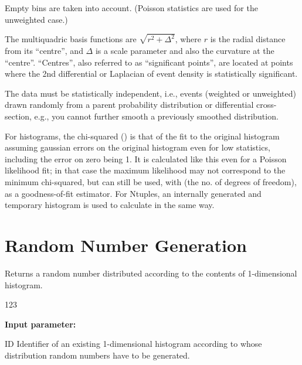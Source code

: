 \Remarks        
\begin{UL}
\item Empty bins are taken into account.  (Poisson statistics are used for the
      unweighted case.)
\item The multiquadric basis functions are $\sqrt{r^2+\Delta^2}$, where $r$ is
      the radial distance from its ``centre'', and $\Delta$ is a scale
      parameter and also the curvature at the ``centre''.  ``Centres'', also
      referred to as ``significant points'', are located at points where the
      2nd differential or Laplacian of event density is statistically
      significant.
\item The data must be statistically independent, i.e., events (weighted or
      unweighted) drawn randomly from a parent probability distribution or
      differential cross-section, e.g., you cannot further smooth a previously
      smoothed distribution.
\item For histograms, the chi-squared () is that of the fit to the
      original histogram assuming gaussian errors on the original histogram
      even for low statistics, including the error on zero being 1.  It is
      calculated like this even for a Poisson likelihood fit; in that case the
      maximum likelihood may not correspond to the minimum chi-squared, but
       can still be used, with  (the no. of degrees of freedom), as a
      goodness-of-fit estimator.  For Ntuples, an internally generated and
      temporary histogram is used to calculate  in the same way.
\end{UL}

%
%



\section{Random Number Generation}
\label{HRANDOMN}
 
 
\Action
Returns a random number distributed according to the contents of
1-dimensional histogram.
 
\begin{DLtt}{123}
\item[{\rm\bf Input parameter:}]
\item[ID] Identifier of an existing 1-dimensional histogram according to
whose distribution random numbers have to be generated.
\end{DLtt}
 
